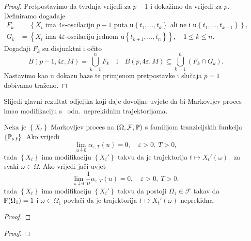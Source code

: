 \documentclass[main.tex]{subfiles}
\begin{document}
\begin{proof}
	Pretpostavimo da tvrdnja vrijedi za \( p-1 \) i dokažimo da vrijedi za \( p \). Definiramo događaje
	\begin{equation}
		\begin{aligned}
			F_k & = \left\{ X_t \text{\ ima\ } 4\varepsilon \text{-oscilaciju\ } p-1 \text{\ puta u} \left\{ t_1, \ldots, t_k \right\} \text{\ ali ne i u} \left\{ t_1, \ldots, t_{k-1} \right\}  \right\}, \\
			G_k & = \left\{ X_t \text{\ ima\ } 4\varepsilon \text{-oscilaciju jednom u} \left\{t_{k+1},\ldots,t_n\right\}\right\}, \quad 1 \le k \le n.
		\end{aligned}
	\end{equation}
	Događaji \( F_k \) su disjunktni i očito
	\begin{equation}
		B(p-1, 4\varepsilon, M) = \bigcup_{k=1}^n F_k \quad \mathrm i \quad B(p, 4\varepsilon, M) \subseteq \bigcup_{k=1}^n (F_k \cap G_k).
	\end{equation}
	Nastavimo kao u dokazu baze te primjenom pretpostavke i slučaja \( p=1 \) dobivamo traženo.
\end{proof}

\bigskip
Slijedi glavni rezultat odjeljka koji daje dovoljne uvjete da bi Markovljev proces imao modifikaciju s \cadlag \ odn.\ neprekidnim trajektorijama.

\begin{teorem}\label{markov-dov}
	Neka je \( \left\{ X_t \right\} \) Markovljev proces na \( \left( \Omega, \mathcal F, \P \right) \) s familijom tranzicijskih funkcija
	\( \left\{ \Ptrans_{s,t} \right\} \). Ako vrijedi
	\begin{equation} \label{markov-dov1}
		\lim\limits_{u \downarrow 0} \alpha_{\varepsilon, T}(u) = 0, \quad \varepsilon >0, \ T > 0,
	\end{equation}
	tada \( \left\{ X_t \right\} \) ima modifikaciju \( \left\{ X_t' \right\} \) takvu
	da je trajektorija \( t \mapsto X_t'(\omega) \) \cadlag \ za svaki \( \omega \in \Omega \).
	Ako vrijedi jači uvjet
	\begin{equation}
		\lim\limits_{u \downarrow 0} \frac 1u \alpha_{\varepsilon, T}(u) = 0, \quad \varepsilon > 0, \ T > 0,
	\end{equation}
	tada \( \left\{ X_t \right\} \) ima modifikaciju \( \left\{ X_t' \right\} \) takvu da postoji \( \Omega_1 \in \mathcal F \)
	takav da \( \P(\Omega_1) = 1 \) i \( \omega \in \Omega_1 \) povlači da je trajektorija \( t \mapsto X_t'(\omega) \) neprekidna.
\end{teorem}

\begin{proof}
\end{proof}

\begin{teorem}\label{adit-gauss}
\end{teorem}

\begin{proof}
\end{proof}
\end{document}
